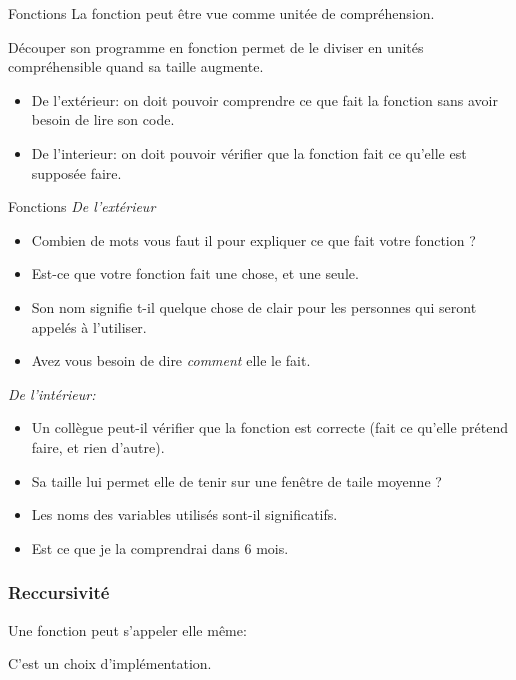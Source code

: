 \documentclass{beamer}
\begin{document}
\begin{frame}{Fonctions}
  La fonction peut être vue comme unitée de compréhension.
  
  Découper son programme en fonction permet de le diviser en unités compréhensible quand sa taille augmente.

  \begin{itemize}
  \item De l'extérieur: on doit pouvoir comprendre ce que fait la fonction sans avoir besoin de lire son code.
  \item De l'interieur: on doit pouvoir vérifier que la fonction fait ce qu'elle est supposée faire.
  \end{itemize}
\end{frame}

\begin{frame}{Fonctions}
  {\em De l'extérieur}
  \begin{itemize}
  \item Combien de mots vous faut il pour expliquer ce que fait votre fonction ?
  \item Est-ce que votre fonction fait une chose, et une seule.
  \item Son nom signifie t-il quelque chose de clair pour les personnes qui seront appelés à l'utiliser.
  \item Avez vous besoin de dire {\em comment} elle le fait.
  \end{itemize}    
  {\em De l'intérieur:}
  \begin{itemize}
  \item Un collègue peut-il vérifier que la fonction est correcte (fait ce qu'elle prétend faire, et rien d'autre).
  \item Sa taille lui permet elle de tenir sur une fenêtre de taile moyenne ?
  \item Les noms des variables utilisés sont-il significatifs.
  \item Est ce que je la comprendrai dans 6 mois.
  \end{itemize}
\end{frame}

\begin{frame}[fragile]\frametitle{Reccursivité}
  Une fonction peut s'appeler elle même:
  
  \fbox{}

  C'est un choix d'implémentation.
\end{frame}
\end{document}
